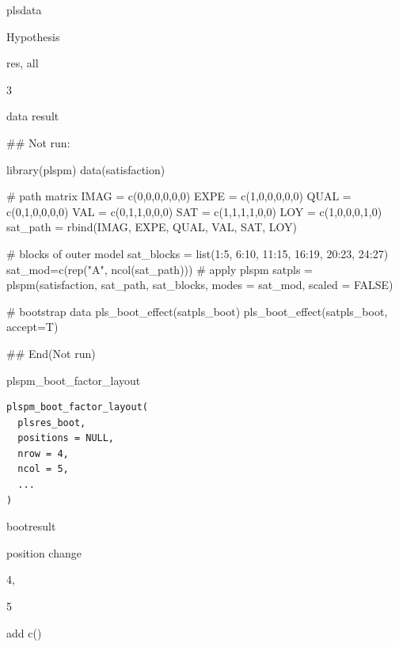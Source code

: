 \documentclass[a4paper]{book}
\begin{document}
%
\begin{Arguments}
\begin{ldescription}
\item[\code{plsres}] plsdata

\item[\code{accept}] Hypothesis

\item[\code{type}] res, all

\item[\code{digits}] 3
\end{ldescription}
\end{Arguments}
%
\begin{Value}
data result
\end{Value}
%
\begin{Examples}
\begin{ExampleCode}

## Not run: 

library(plspm)
data(satisfaction)

# path matrix
IMAG = c(0,0,0,0,0,0)
EXPE = c(1,0,0,0,0,0)
QUAL = c(0,1,0,0,0,0)
VAL = c(0,1,1,0,0,0)
SAT = c(1,1,1,1,0,0)
LOY = c(1,0,0,0,1,0)
sat_path = rbind(IMAG, EXPE, QUAL, VAL, SAT, LOY)

# blocks of outer model
sat_blocks = list(1:5, 6:10, 11:15, 16:19, 20:23, 24:27)
sat_mod=c(rep("A", ncol(sat_path)))
# apply plspm
satpls = plspm(satisfaction, sat_path, sat_blocks, modes = sat_mod,
               scaled = FALSE)



  # bootstrap data
pls_boot_effect(satpls_boot)
pls_boot_effect(satpls_boot, accept=T)


## End(Not run)

\end{ExampleCode}
\end{Examples}
%
\begin{Description}
plspm\_boot\_factor\_layout
\end{Description}
%
\begin{Usage}
\begin{verbatim}
plspm_boot_factor_layout(
  plsres_boot,
  positions = NULL,
  nrow = 4,
  ncol = 5,
  ...
)
\end{verbatim}
\end{Usage}
%
\begin{Arguments}
\begin{ldescription}
\item[\code{plsres\_boot}] bootresult

\item[\code{positions}] position change

\item[\code{nrow}] 4,

\item[\code{ncol}] 5

\item[\code{...}] add c()
\end{ldescription}
\end{Arguments}
\end{document}
